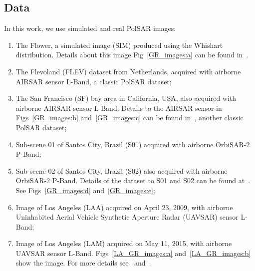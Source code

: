 \documentclass[remotesensing,article,submit,pdftex,moreauthors]{Definitions/mdpi}
\begin{document}
\subsection{Data}
In this work, we use simulated and real PolSAR images:
\begin{enumerate}[label=(\roman*)]
\item \label{item:image_01} The Flower, a simulated image (SIM) produced using the Whishart distribution. Details about this image Fig~\eqref{GR_images:a} can be found in~\citet{gmbf,gamf, good}.
\item \label{item:image_02} The Flevoland (FLEV) dataset from Netherlands, acquired with airborne AIRSAR sensor L-Band, a classic PolSAR dataset;

\item \label{item:image_03} The San Francisco (SF) bay area in California, USA, also acquired with airborne AIRSAR sensor L-Band. Details to the AIRSAR sensor in Figs~\eqref{GR_images:b} and~\eqref{GR_images:c} can be found in~\citet{CBJ_2004}, another classic PolSAR dataset;
\item \label{item:image_04} Sub-scene 01 of Santos City, Brazil (S01) acquired with airborne OrbiSAR-2 P-Band;
\item \label{item:image_05} Sub-scene 02 of Santos City, Brazil (S02) also acquired with airborne OrbiSAR-2 P-Band. Details of the dataset to S01 and S02 can be found at~\citet{dataset_ieee_santos,barff}. See Figs~\eqref{GR_images:d} and~\eqref{GR_images:e};
\item \label{item:image_06} Image of Los Angeles (LAA) acquired on April 23, 2009, with airborne Uninhabited Aerial Vehicle Synthetic Aperture Radar (UAVSAR) sensor L-Band;
\item \label{item:image_07} Image of Los Angeles (LAM) acquired on May 11, 2015, with airborne UAVSAR sensor L-Band. Figs~\eqref{LA_GR_images:a} and~\eqref{LA_GR_images:b} show the image. For more details see~\citet{dataset_ieee_LA} and~\citet{nvs}. 
\end{enumerate}
\end{document}
